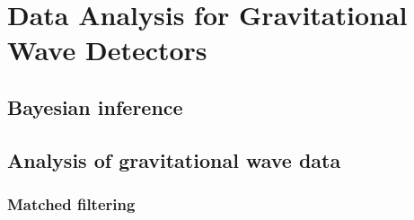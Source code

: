 \documentclass{kentigern}
\theoremstyle{definition}
\begin{document}


% 

%  

%  

%  

%  


\part{Data Analysis for Gravitational Wave Detectors}
\label{part:data-analysis}
 
\chapter{Bayesian inference}
\label{cha:bayesian-inference}



%

\chapter[Data Analysis]{Analysis of gravitational wave data}
\label{cha:data-analys-grav}

\section{Matched filtering}
\label{sec:matched-filtering}

\end{document}
